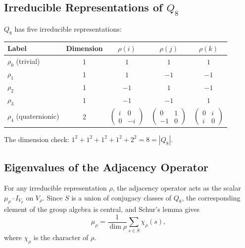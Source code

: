 \documentclass[11pt,a4paper]{article}
\begin{document}
    \subsection{Irreducible Representations of $Q_8$}

      $Q_8$ has five irreducible representations:
      \begin{center}
        \begin{tabular}{lcccc}
          \hline
          Label & Dimension & $\rho(i)$ & $\rho(j)$ & $\rho(k)$ \\
          \hline
          $\rho_0$ (trivial) & 1 & $1$ & $1$ & $1$ \\
          $\rho_1$ & 1 & $1$ & $-1$ & $-1$ \\
          $\rho_2$ & 1 & $-1$ & $1$ & $-1$ \\
          $\rho_3$ & 1 & $-1$ & $-1$ & $1$ \\
          $\rho_4$ (quaternionic) & 2 & $\begin{pmatrix}i&0\\0&-i\end{pmatrix}$
          & $\begin{pmatrix}0&1\\-1&0\end{pmatrix}$
          & $\begin{pmatrix}0&i\\i&0\end{pmatrix}$ \\
          \hline
        \end{tabular}
      \end{center}
      The dimension check: $1^2 + 1^2 + 1^2 + 1^2 + 2^2 = 8 = |Q_8|$. \checkmark

    \subsection{Eigenvalues of the Adjacency Operator}

      For any irreducible representation $\rho$, the adjacency operator acts as the
      scalar $\mu_\rho \cdot I_{V_\rho}$ on $V_\rho$.
      Since $S$ is a union of conjugacy classes of $Q_8$, the corresponding element
      of the group algebra is central, and Schur's lemma gives
      \begin{equation}
        \mu_\rho = \frac{1}{\dim \rho} \sum_{s \in S} \chi_\rho(s),
      \end{equation}
      where $\chi_\rho$ is the character of $\rho$.
\end{document}
